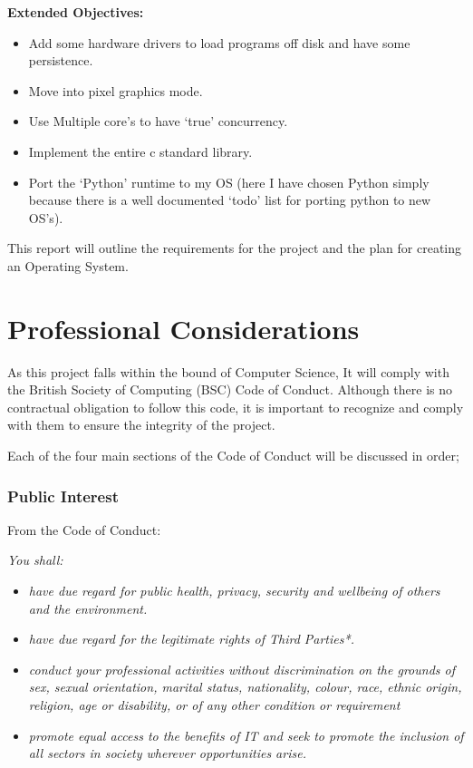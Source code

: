 \documentclass[a4paper]{report}
\begin{document}
\textbf {Extended Objectives:}


\begin{itemize}
\item Add some hardware drivers to load programs off disk and have some persistence.
\item Move into pixel graphics mode.
\item Use Multiple core's to have `true' concurrency.
\item Implement the entire c standard library.
\item Port the `Python' runtime to my OS (here I have chosen Python simply because there is a well documented `todo' list for porting python to new OS's).
\end{itemize}



This report will outline the requirements for the project and the plan for creating an Operating System.

\chapter*{Professional Considerations}

As this project falls within the bound of Computer Science, It will comply with the British Society of Computing (BSC) Code of Conduct. Although there is no contractual obligation to follow this code, it is important to recognize and comply with them to ensure the integrity of the project.

Each of the four main sections of the Code of Conduct will be discussed in order;

\subsection*{Public Interest}

From the Code of Conduct: \cite{CoC}

\textit{You shall:}
\begin{itemize}
\item \textit{have due regard for public health, privacy, security and wellbeing of others and the environment.}
\item \textit{have due regard for the legitimate rights of Third Parties*.}
\item \textit{conduct your professional activities without discrimination on the grounds of sex, sexual orientation, marital status, nationality, colour, race, ethnic origin, religion, age or disability, or of any other condition or requirement }
\item \textit{promote equal access to the benefits of IT and seek to promote the inclusion of all sectors in society wherever opportunities arise.}
\end{itemize}
\end{document}
